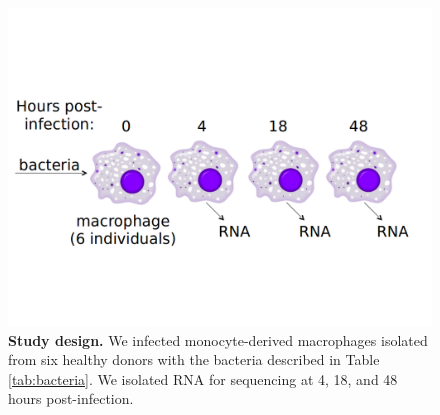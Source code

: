 \begin{figure}[htbp]
\centering
\includegraphics[width=5in]{img/ch02/fig-S01-study-design.png}
\caption[Study design.]{\textbf{Study design.} We infected
  monocyte-derived macrophages isolated from six healthy donors with
  the bacteria described in Table \ref{tab:bacteria}. We isolated RNA
  for sequencing at 4, 18, and 48 hours post-infection.}
\label{fig:study-design}
\end{figure}

